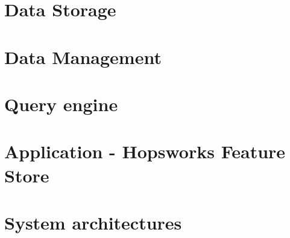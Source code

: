 

\section{Data Storage}
    \label{sec:data_storage}
    

\section{Data Management}
    \label{sec:data_management}
    

\section{Query engine}
    \label{sec:query_engine}
    

\section{Application - Hopsworks Feature Store}
    \label{sec:hopswoks_feature_store}
    

\section{System architectures}
    \label{sec:arch_sys}
    

%    